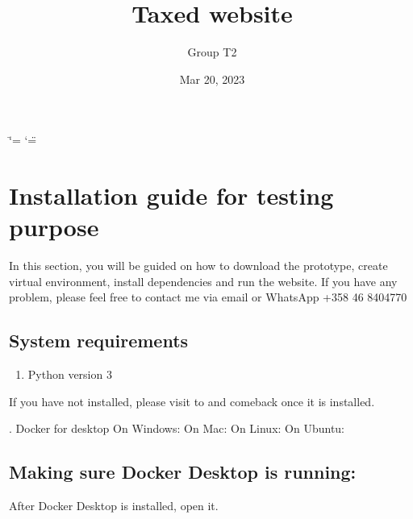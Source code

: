 \documentclass[letterpaper,10pt,english]{sphinxmanual}
\title{Taxed website}
\date{Mar 20, 2023}
\author{Group T2}
\begin{document}
\ifdefined\shorthandoff
  \ifnum\catcode`\=\string=\active\shorthandoff{=}\fi
  \ifnum\catcode`\"=\active{}\fi
\fi

\pagestyle{empty}
\sphinxmaketitle
\pagestyle{plain}
\sphinxtableofcontents
\pagestyle{normal}
\label{\detokenize{index::doc}}


\sphinxstepscope


\chapter{Installation guide for testing purpose}
\label{\detokenize{pages/installation-testing:installation-guide-for-testing-purpose}}\label{\detokenize{pages/installation-testing::doc}}
\sphinxAtStartPar
In this section, you will be guided on how to download the prototype, create virtual environment, install dependencies and run the website.
If you have any problem, please feel free to contact me via email  or WhatsApp +358 46 8404770


\section{System requirements}
\label{\detokenize{pages/installation-testing:system-requirements}}\begin{enumerate}
%
\item {} 
\sphinxAtStartPar
Python version 3

\end{enumerate}

\sphinxAtStartPar
If you have not installed, please visit to  and comeback once it is installed.

. Docker for desktop
On Windows: 
On Mac: 
On Linux: 
On Ubuntu: 


\section{Making sure Docker Desktop is running:}
\label{\detokenize{pages/installation-testing:making-sure-docker-desktop-is-running}}
\sphinxAtStartPar
After Docker Desktop is installed, open it.
\end{document}
